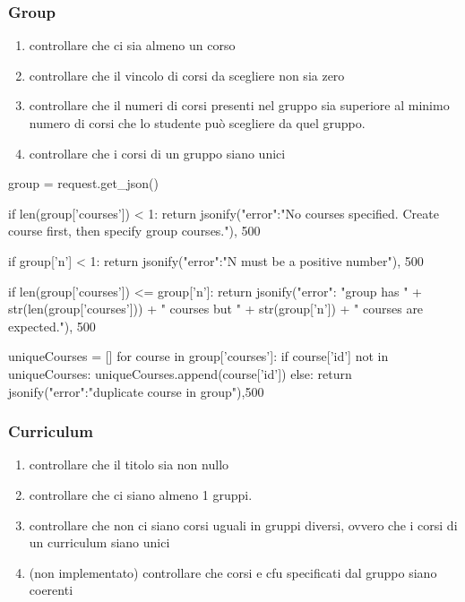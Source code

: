 \documentclass{article}
\begin{document}
\subsubsection{Group}
\begin{enumerate}
\item controllare che ci sia almeno un corso
\item controllare che il vincolo di corsi da scegliere non sia zero
\item controllare che il numeri di corsi presenti nel gruppo sia superiore al minimo numero di corsi che lo studente può scegliere da quel gruppo.
\item controllare che i corsi di un gruppo siano unici
\end{enumerate}
\begin{python}
group =	request.get_json()

		if len(group['courses']) < 1:
			return jsonify({"error":"No courses specified. Create course first, then specify group courses."}), 500
		
		if group['n'] < 1:
			return jsonify({"error":"N must be a positive number"}), 500

		if len(group['courses']) <= group['n']:
			return jsonify({"error": "group has " + str(len(group['courses'])) + " courses but " + str(group['n']) + " courses are expected."}), 500

		uniqueCourses = []
		for course in group['courses']:
			if course['id'] not in uniqueCourses:
				uniqueCourses.append(course['id'])
			else:
				return jsonify({"error":"duplicate course in group"}),500

\end{python}

\subsubsection{Curriculum}
\begin{enumerate}
\item controllare che il titolo sia non nullo
\item controllare che ci siano almeno 1 gruppi.
\item controllare che non ci siano corsi uguali in gruppi diversi, ovvero che i corsi di un curriculum siano unici
\item (non implementato) controllare che corsi e cfu specificati dal gruppo siano coerenti
\end{enumerate}
\end{document}
